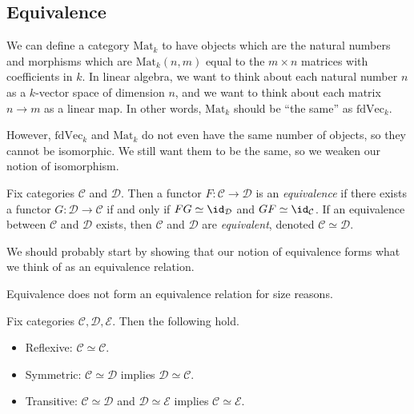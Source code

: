 
\subsection{Equivalence}
We can define a category $\mathrm{Mat}_k$ to have objects which are the natural numbers and morphisms which are $\mathrm{Mat}_k(n,m)$ equal to the $m\times n$ matrices with coefficients in $k$. In linear algebra, we want to think about each natural number $n$ as a $k$-vector space of dimension $n$, and we want to think about each matrix $n\to m$ as a linear map. In other words, $\mathrm{Mat}_k$ should be ``the same'' as $\mathrm{fdVec}_k$.

However, $\mathrm{fdVec}_k$ and $\mathrm{Mat}_k$ do not even have the same number of objects, so they cannot be isomorphic. We still want them to be the same, so we weaken our notion of isomorphism.
\begin{defi}[Equivalence]
	Fix categories $\mathcal C$ and $\mathcal D$. Then a functor $F:\mathcal C\to\mathcal D$ is an \textit{equivalence} if there exists a functor $G:\mathcal D\to\mathcal C$ if and only if $FG\simeq\id_\mathcal D$ and $GF\simeq\id_\mathcal C$. If an equivalence between $\mathcal C$ and $\mathcal D$ exists, then $\mathcal C$ and $\mathcal D$ are \textit{equivalent}, denoted $\mathcal C\simeq\mathcal D$.
\end{defi}
We should probably start by showing that our notion of equivalence forms what we think of as an equivalence relation.
\begin{remark}[Bryce]
	Equivalence does not form an equivalence relation for size reasons.
\end{remark}
\begin{lemma}
	Fix categories $\mathcal C,\mathcal D,\mathcal E$. Then the following hold.
	\begin{itemize}
		\item Reflexive: $\mathcal C\simeq\mathcal C$.
		\item Symmetric: $\mathcal C\simeq\mathcal D$ implies $\mathcal D\simeq\mathcal C$.
		\item Transitive: $\mathcal C\simeq\mathcal D$ and $\mathcal D\simeq\mathcal E$ implies $\mathcal C\simeq\mathcal E$.
	\end{itemize}
\end{lemma}
